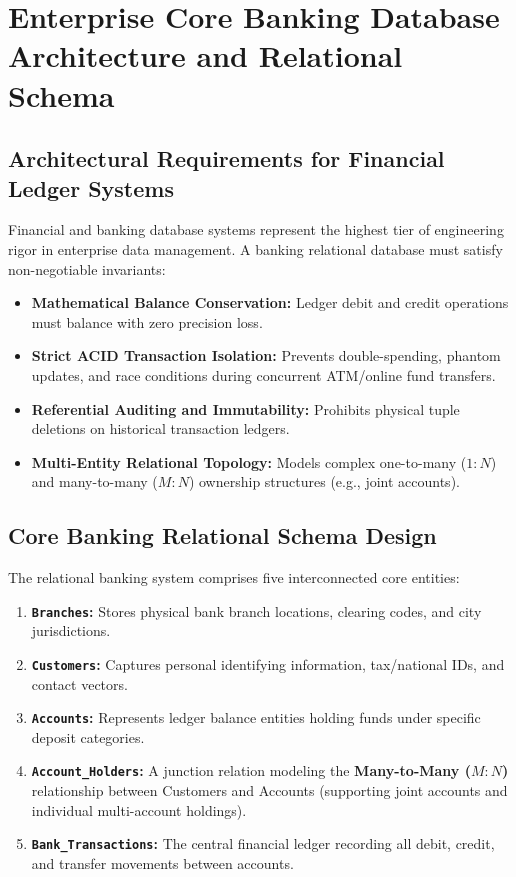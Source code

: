 \section{Enterprise Core Banking Database Architecture and Relational Schema}
\label{sec:dbms_banking_schema}

\subsection{Architectural Requirements for Financial Ledger Systems}
Financial and banking database systems represent the highest tier of engineering rigor in enterprise data management. A banking relational database must satisfy non-negotiable invariants:
\begin{itemize}
    \item \textbf{Mathematical Balance Conservation:} Ledger debit and credit operations must balance with zero precision loss.
    \item \textbf{Strict ACID Transaction Isolation:} Prevents double-spending, phantom updates, and race conditions during concurrent ATM/online fund transfers.
    \item \textbf{Referential Auditing and Immutability:} Prohibits physical tuple deletions on historical transaction ledgers.
    \item \textbf{Multi-Entity Relational Topology:} Models complex one-to-many ($1:N$) and many-to-many ($M:N$) ownership structures (e.g., joint accounts).
\end{itemize}

\subsection{Core Banking Relational Schema Design}
The relational banking system comprises five interconnected core entities:
\begin{enumerate}
    \item \textbf{\texttt{Branches}:} Stores physical bank branch locations, clearing codes, and city jurisdictions.
    \item \textbf{\texttt{Customers}:} Captures personal identifying information, tax/national IDs, and contact vectors.
    \item \textbf{\texttt{Accounts}:} Represents ledger balance entities holding funds under specific deposit categories.
    \item \textbf{\texttt{Account\_Holders}:} A junction relation modeling the \textbf{Many-to-Many ($M:N$)} relationship between Customers and Accounts (supporting joint accounts and individual multi-account holdings).
    \item \textbf{\texttt{Bank\_Transactions}:} The central financial ledger recording all debit, credit, and transfer movements between accounts.
\end{enumerate}

